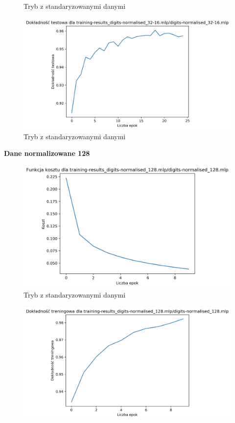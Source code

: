 \documentclass{classrep}
\begin{document}
{{{\begin{figure}[!htbp]
                    \caption{Tryb z standaryzowanymi danymi}
                \end{figure}
                \begin{figure}[!htbp]
                    \centering
                    \includegraphics[width=165mm]{wykresy/digits-normalised_32-16_mlp_testing-accuracy.png}
                    \caption{Tryb z standaryzowanymi danymi}
                \end{figure}
                \FloatBarrier
                \textbf{Dane normalizowane 128}
                \begin{figure}[!htbp]
                    \centering
                    \includegraphics[width=155mm]{wykresy/digits-normalised_128_mlp_cost.png}
                    \caption{Tryb z standaryzowanymi danymi}
                \end{figure}
                \begin{figure}[!htbp]
                    \centering
                    \includegraphics[width=165mm]{wykresy/digits-normalised_128_mlp_training-accuracy.png}

\end{figure}}}}
\end{document}
